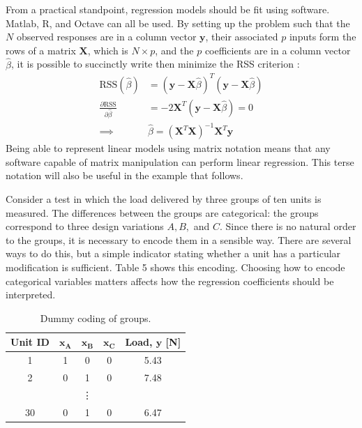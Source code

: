 \documentclass[11pt,a4paper,article]{memoir} %
\begin{document}
From a practical standpoint, regression models should be fit using software. Matlab, R, and Octave can all be used. By setting up the problem such that the $N$ observed responses are in a column vector $\mathbf{y}$, their associated $p$ inputs form the rows of a matrix $\mathbf{X}$, which is $N \times p$, and the $p$ coefficients are in a column vector $\hat{\beta}$, it is possible to succinctly write then minimize the RSS criterion \cite{hastie2013elements}:
\begin{align}
	\text{RSS}(\hat{\beta}) &= (\mathbf{y - X}\hat{\beta})^T(\mathbf{y - X}\hat{\beta}) \\
	\frac{\partial \text{RSS}}{\partial \hat{\beta}} &= -2\mathbf{X}^T(\mathbf{y - X}\hat{\beta}) = 0 \\
	\implies &\hat{\beta} = (\mathbf{X}^T\mathbf{X})^{-1}\mathbf{X}^T \mathbf{y} \label{eq:normal_eqtn}
\end{align}
Being able to represent linear models using matrix notation means that any software capable of matrix manipulation can perform linear regression. This terse notation will also be useful in the example that follows.

Consider a test in which the load delivered by three groups of ten units is measured. The differences between the groups are categorical: the groups correspond to three design variations $A, B,$ and $C$. Since there is no natural order to the groups, it is necessary to encode them in a sensible way. There are several ways to do this, but a simple indicator stating whether a unit has a particular modification is sufficient. Table 5 shows this encoding. Choosing how to encode categorical variables matters affects how the regression coefficients should be interpreted.
\begin{table}
\centering
\caption{Dummy coding of groups.}
\small
\begin{tabular}{c c c c c}
\toprule
\textbf{Unit ID}                 & $\mathbf{x_A}$ & $\mathbf{x_B}$ & $\mathbf{x_C}$ & \textbf{Load, $\mathbf{y}$ [N]} \\
\midrule
1                       & 1 & 0 & 0 & 5.43         \\
2                       & 0 & 1 & 0 & 7.48         \\ 
& & \vdots & & \\
30 & 0 & 1 & 0 & 6.47 \\
\bottomrule
\end{tabular}
\end{table}
\end{document}
